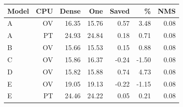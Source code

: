 \begin{tabular}{lrrrrrr}
\hline
Model & CPU & Dense & One & Saved & \% & NMS \\
\hline
A & OV & 16.35 & 15.76 & 0.57 & 3.48 & 0.08 \\
A & PT & 24.93 & 24.84 & 0.18 & 0.71 & 0.08 \\
B & OV & 15.66 & 15.53 & 0.15 & 0.88 & 0.08 \\
C & OV & 15.86 & 16.37 & -0.24 & -1.50 & 0.08 \\
D & OV & 15.82 & 15.88 & 0.74 & 4.73 & 0.08 \\
E & OV & 19.05 & 19.13 & -0.22 & -1.15 & 0.08 \\
E & PT & 24.46 & 24.22 & 0.05 & 0.21 & 0.08 \\
\hline
\end{tabular}
